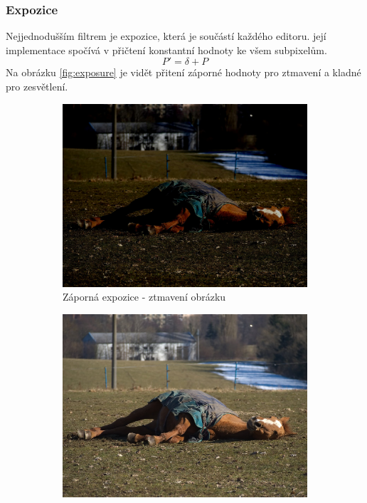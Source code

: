 \documentclass[11pt, a4paper, titlepage]{article}
\begin{document}
\subsubsection{Expozice}
Nejjednodušším filtrem je expozice, která je součástí každého editoru.
její implementace spočívá v přičtení konstantní hodnoty ke všem subpixelům.
$$P' = \delta + P$$
Na obrázku \ref{fig:exposure} je vidět přitení záporné hodnoty pro ztmavení a kladné pro zesvětlení.
\begin{figure}[h]
    \centering
    \begin{subfigure}[t]{0.25\textwidth}
        \vskip 0pt
        \includegraphics[width=1.0\textwidth]{horse_exposure_minus.jpg}
        \caption{Záporná expozice - ztmavení obrázku}
    \end{subfigure}
    \hspace{1cm}
    \begin{subfigure}[t]{0.25\textwidth}
        \vskip 0pt
        \includegraphics[width=1.0\textwidth]{horse_original.jpg}

\end{subfigure}
\end{figure}
\end{document}
